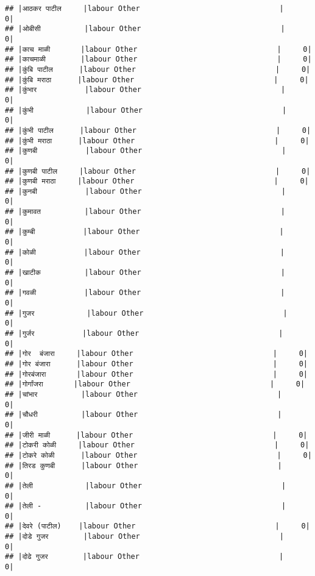 \documentclass[
]{article}
\begin{document}
\begin{verbatim}
## |आठकर पाटील     |labour Other                                |     0|
## |ओबीसी          |labour Other                                |     0|
## |काच माळी       |labour Other                                |     0|
## |काचमाळी        |labour Other                                |     0|
## |कुंबि पाटील      |labour Other                                |     0|
## |कुंबि मराठा      |labour Other                                |     0|
## |कुंभार           |labour Other                                |     0|
## |कुंभी            |labour Other                                |     0|
## |कुंभी पाटील      |labour Other                                |     0|
## |कुंभी मराठा      |labour Other                                |     0|
## |कुणबी           |labour Other                                |     0|
## |कुणबी पाटील     |labour Other                                |     0|
## |कुणबी मराठा     |labour Other                                |     0|
## |कुनबी           |labour Other                                |     0|
## |कुमावत          |labour Other                                |     0|
## |कुम्बी           |labour Other                                |     0|
## |कोळी           |labour Other                                |     0|
## |खाटीक          |labour Other                                |     0|
## |गवळी           |labour Other                                |     0|
## |गुजर            |labour Other                                |     0|
## |गुर्जर           |labour Other                                |     0|
## |गोर  बंजारा     |labour Other                                |     0|
## |गोर बंजारा      |labour Other                                |     0|
## |गोरबंजारा       |labour Other                                |     0|
## |गोर्गांजरा       |labour Other                                |     0|
## |चांभार          |labour Other                                |     0|
## |चौधरी          |labour Other                                |     0|
## |जीरी माळी      |labour Other                                |     0|
## |टोकरी कोळी     |labour Other                                |     0|
## |टोकरे कोळी      |labour Other                                |     0|
## |तिरड कुणबी      |labour Other                                |     0|
## |तेली            |labour Other                                |     0|
## |तेली -          |labour Other                                |     0|
## |देवरे (पाटील)    |labour Other                                |     0|
## |दोडे गुजर        |labour Other                                |     0|
## |दोढे गुजर        |labour Other                                |     0|

\end{verbatim}
\end{document}
